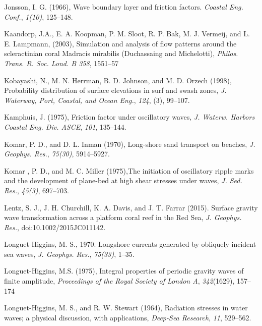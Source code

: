 \documentclass[default,jgrga]{agutex2015}
\begin{document}
\begin{article}
\begin{thebibliography}{}
Jonsson, I. G. (1966), Wave boundary layer and friction factors. \textit{Coastal Eng. Conf.}, \textit{1(10)}, 125--148.

Kaandorp, J.A., E. A. Koopman, P. M. Sloot, R. P. Bak, M. J. Vermeij, and L. E. Lampmann, (2003), Simulation and analysis of flow patterns around the scleractinian coral Madracis mirabilis (Duchassaing and Michelotti), \textit{Philos. Trans. R. Soc. Lond. B 358}, 1551--57

Kobayashi, N., M. N. Herrman, B. D. Johnson, and M. D. Orzech (1998), Probability distribution of surface elevations in surf and swash zones, \textit{J. Waterway, Port, Coastal, and Ocean Eng.}, \textit{124}, (3), 99--107.

Kamphuis, J. (1975), Friction factor under oscillatory waves, \textit{J. Waterw. Harbors Coastal Eng. Div. ASCE}, \textit{101}, 135--144.

Komar, P. D., and D. L. Inman (1970), Long-shore sand transport on beaches, \textit{J. Geophys. Res.}, \textit{75(30)}, 5914--5927.

Komar , P. D., and M. C. Miller (1975),The initiation of oscillatory ripple marks and the development of plane-bed at high shear stresses under waves, \textit{J. Sed. Res.}, \textit{45(3)}, 697--703.

Lentz, S. J., J. H. Churchill, K. A. Davis, and J. T. Farrar (2015). Surface gravity wave transformation across a platform coral reef in the Red Sea, \textit{J. Geophys. Res.}, doi:10.1002/2015JC011142.

Longuet-Higgins, M. S., 1970. Longshore currents generated by obliquely incident sea waves, \textit{J. Geophys. Res.}, \textit{75(33)}, 1--35.

Longuet-Higgins, M.S. (1975), Integral properties of periodic gravity waves of finite amplitude, \textit{Proceedings of the Royal Society of London A}, \textit{342}(1629), 157--174

Longuet-Higgins, M. S., and R. W. Stewart (1964), Radiation stresses in water waves; a physical discussion, with applications, \textit{Deep-Sea Research}, \textit{11}, 529--562.


\end{thebibliography}
\end{article}
\end{document}
